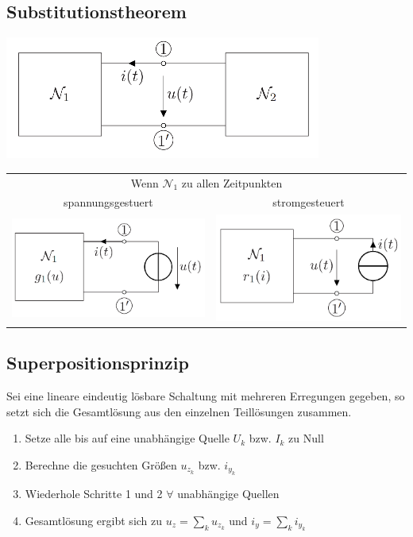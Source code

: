\documentclass[fs, footer]{latex4ei}
\begin{document}
\begin{multicols*}{4}
    \subsection{Substitutionstheorem}
    \includegraphics[scale=.27]{img/subst}\\
    \begin{tabular}{cc}
        \multicolumn{2}{c}{Wenn $\mathcal N_1$ zu allen Zeitpunkten} \\
        spannungsgestuert                        & stromgesteuert    \\
        \includegraphics[scale=.25]{img/subst-u} &
        \includegraphics[scale=.25]{img/subst-i}
    \end{tabular}

    \subsection{Superpositionsprinzip}
    Sei eine lineare eindeutig lösbare Schaltung mit mehreren Erregungen gegeben, so setzt sich die Gesamtlösung aus den einzelnen Teillösungen zusammen.
    \begin{enumerate}\itemsep0pt
        \item Setze alle bis auf eine unabhängige Quelle $U_k$ bzw. $I_k$ zu Null
        \item Berechne die gesuchten Größen $u_{z_k}$ bzw. $i_{y_k}$
        \item Wiederhole Schritte 1 und 2 $\forall$ unabhängige Quellen
        \item Gesamtlösung ergibt sich zu $u_z = \sum_ku_{z_k}$ und $i_y = \sum_ki_{y_k}$
    \end{enumerate}


\end{multicols*}
\end{document}
